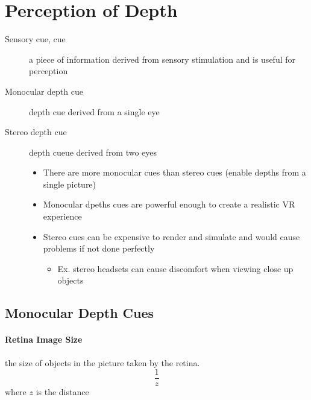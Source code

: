 \section{Perception of Depth}

\begin{description}
  \item[Sensory cue, cue] a piece of information derived from sensory
  stimulation and is useful for perception
  \item[Monocular depth cue] depth cue derived from a single eye
  \item[Stereo depth cue] depth cueue derived from two eyes
  \begin{itemize}
    \item There are more monocular cues than stereo cues (enable depths from
    a single picture)
    \item Monocular dpeths cues are powerful enough to create a realistic VR
    experience
    \item Stereo cues can be expensive to render and simulate and would cause
    problems if not done perfectly
    \begin{itemize}
      \item Ex. stereo headsets can cause discomfort when viewing close up
      objects
    \end{itemize}
  \end{itemize}
\end{description}

\subsection{Monocular Depth Cues}

  \paragraph{Retina Image Size} the size of objects in the picture taken
  by the retina.
  \begin{equation}
    \frac{1}{z}
  \end{equation}
  where $ z $ is the distance

